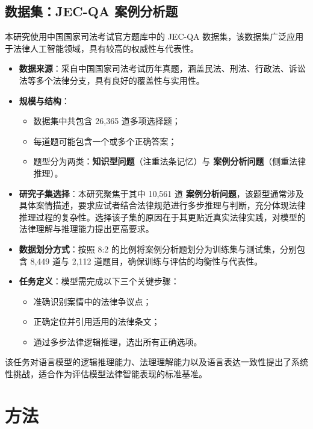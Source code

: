 \documentclass{pkuthesis}
\begin{document}
\subsection{数据集：JEC-QA 案例分析题}

本研究使用中国国家司法考试官方题库中的 JEC-QA 数据集\cite{zhong2020jec}，该数据集广泛应用于法律人工智能领域，具有较高的权威性与代表性。

\begin{itemize}
\item \textbf{数据来源}：采自中国国家司法考试历年真题，涵盖民法、刑法、行政法、诉讼法等多个法律分支，具有良好的覆盖性与实用性。

\item \textbf{规模与结构}：
\begin{itemize}
\item 数据集中共包含 26,365 道多项选择题；
\item 每道题可能包含一个或多个正确答案；
\item 题型分为两类：\textbf{知识型问题}（注重法条记忆）与 \textbf{案例分析问题}（侧重法律推理）。
\end{itemize}

\item \textbf{研究子集选择}：本研究聚焦于其中 10,561 道 \textbf{案例分析问题}，该题型通常涉及具体案情描述，要求应试者结合法律规范进行多步推理与判断，充分体现法律推理过程的复杂性。选择该子集的原因在于其更贴近真实法律实践，对模型的法律理解与推理能力提出更高要求。

\item \textbf{数据划分方式}：按照 8:2 的比例将案例分析题划分为训练集与测试集，分别包含 8,449 道与 2,112 道题目，确保训练与评估的均衡性与代表性。

\item \textbf{任务定义}：模型需完成以下三个关键步骤：
\begin{itemize}
\item 准确识别案情中的法律争议点；
\item 正确定位并引用适用的法律条文；
\item 通过多步法律逻辑推理，选出所有正确选项。
\end{itemize}
\end{itemize}

该任务对语言模型的逻辑推理能力、法理理解能力以及语言表达一致性提出了系统性挑战，适合作为评估模型法律智能表现的标准基准。

\section{方法}
\end{document}
